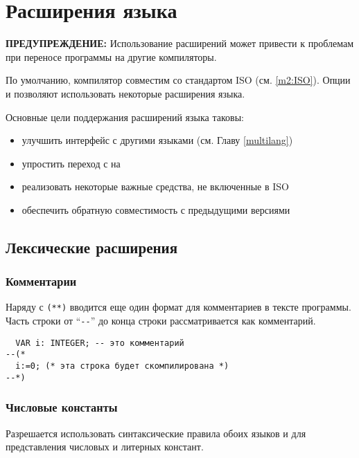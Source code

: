 \section{Расширения языка}\label{m2:ext}

{\bf ПРЕДУПРЕЖДЕНИЕ:} Использование расширений может привести к проблемам
при переносе программы на другие компиляторы.

По умолчанию, \xds{} \mt{} компилятор совместим со стандартом ISO
(см. \ref{m2:ISO}). 
Опции  и  позволяют использовать
некоторые расширения языка.

Основные цели поддержания расширений языка таковы:
\begin{itemize}
\item улучшить интерфейс с другими языками
      (см. Главу \ref{multilang})
\item упростить переход с \mt{} на \ot{}
\item реализовать некоторые важные средства, не включенные в ISO \mt{}
\item обеспечить обратную совместимость с предыдущими версиями
\end{itemize}

\subsection{Лексические расширения}

\subsubsection{Комментарии}

\mextonly

Наряду с \verb|(**)| вводится еще один формат для комментариев
в тексте программы. Часть строки от
``\verb|--|'' до конца строки рассматривается как комментарий.

\Example
\begin{verbatim}
  VAR i: INTEGER; -- это комментарий
--(*
  i:=0; (* эта строка будет скомпилирована *)
--*)
\end{verbatim}

\subsubsection{Числовые константы}

\mextonly

Разрешается использовать синтаксические правила обоих языков 
\mt{} и \ot{} для представления числовых и литерных констант.

